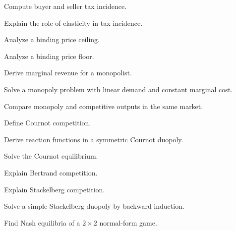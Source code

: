 \begin{exercise}[3]
Compute buyer and seller tax incidence.
\end{exercise}

\begin{exercise}[3]
Explain the role of elasticity in tax incidence.
\end{exercise}

\begin{exercise}[2]
Analyze a binding price ceiling.
\end{exercise}

\begin{exercise}[2]
Analyze a binding price floor.
\end{exercise}

\begin{exercise}[2]
Derive marginal revenue for a monopolist.
\end{exercise}

\begin{exercise}[3]
Solve a monopoly problem with linear demand and constant marginal cost.
\end{exercise}

\begin{exercise}[3]
Compare monopoly and competitive outputs in the same market.
\end{exercise}

\begin{exercise}[2]
Define Cournot competition.
\end{exercise}

\begin{exercise}[3]
Derive reaction functions in a symmetric Cournot duopoly.
\end{exercise}

\begin{exercise}[3]
Solve the Cournot equilibrium.
\end{exercise}

\begin{exercise}[2]
Explain Bertrand competition.
\end{exercise}

\begin{exercise}[2]
Explain Stackelberg competition.
\end{exercise}

\begin{exercise}[3]
Solve a simple Stackelberg duopoly by backward induction.
\end{exercise}

\begin{exercise}[2]
Find Nash equilibria of a \(2\times2\) normal-form game.
\end{exercise}


